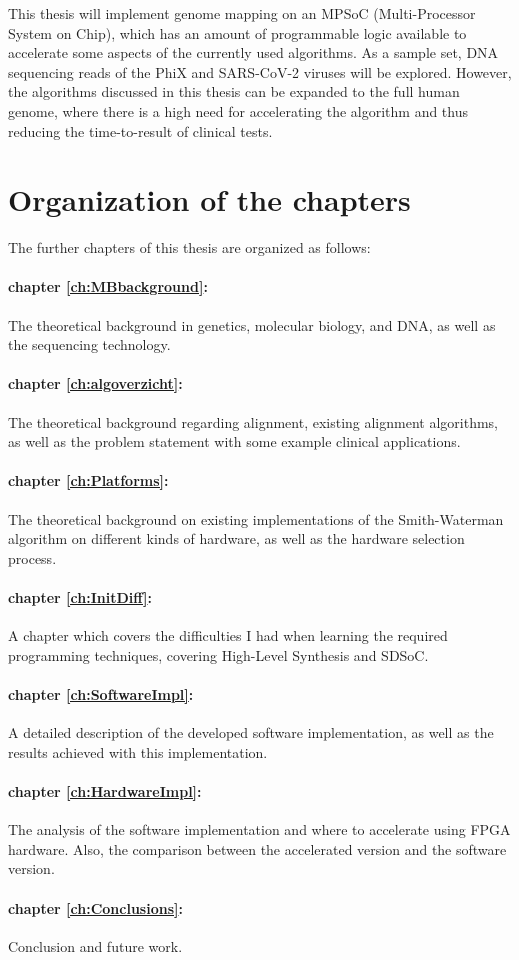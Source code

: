 This thesis will implement genome mapping on an MPSoC (Multi-Processor System on Chip), which has an amount of programmable logic available to accelerate some aspects of the currently used algorithms. As a sample set, DNA sequencing reads of the PhiX and SARS-CoV-2 viruses will be explored. However, the algorithms discussed in this thesis can be expanded to the full human genome, where there is a high need for accelerating the algorithm and thus reducing the time-to-result of clinical tests.

\section{Organization of the chapters}

The further chapters of this thesis are organized as follows:

\paragraph{chapter \ref{ch:MBbackground}:} The theoretical background in genetics, molecular biology, and DNA, as well as the sequencing technology.
\paragraph{chapter \ref{ch:algoverzicht}:} The theoretical background regarding alignment, existing alignment algorithms, as well as the problem statement with some example clinical applications.
\paragraph{chapter \ref{ch:Platforms}:} The theoretical background on existing implementations of the Smith-Waterman algorithm on different kinds of hardware, as well as the hardware selection process.
\paragraph{chapter \ref{ch:InitDiff}:} A chapter which covers the difficulties I had when learning the required programming techniques, covering High-Level Synthesis and SDSoC. 
\paragraph{chapter \ref{ch:SoftwareImpl}:} A detailed description of the developed software implementation, as well as the results achieved with this implementation.
\paragraph{chapter \ref{ch:HardwareImpl}:} The analysis of the software implementation and where to accelerate using FPGA hardware. Also, the comparison between the accelerated version and the software version.
\paragraph{chapter \ref{ch:Conclusions}:} Conclusion and future work.